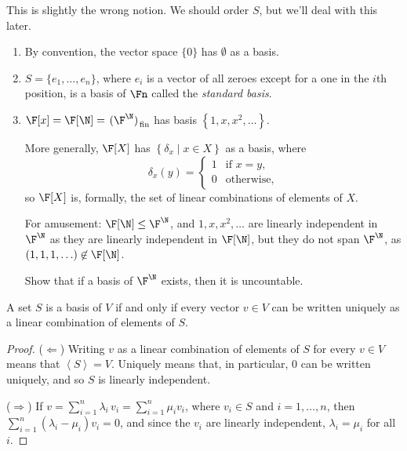 \vspace{3pt}

\begin{remark}
	This is slightly the wrong notion. We should order $S$, but we'll deal with this later. %
\end{remark}

\begin{examples}
	\begin{enumerate}
		\shortskip
		\item By convention, the vector space $\{0\}$ has $\emptyset$ as a basis.
		\item $S=\{e_1,\ldots,e_n\}$, where $e_i$ is a vector of all zeroes except for a one in the $i$th position, is a basis of $\Fn$ called the \emph{standard basis}. %

		\item $\F[x] = \F[\N] = \left.(\F^\N)\right._\text{fin}$ has basis $\left\{1,x,x^2,\ldots\right\}$. %
		
		More generally, $\F[X]$ has $\left\{\delta_x \mid x\in X\right\}$ as a basis, where %
		\begin{equation*}
			\delta_x(y) =
			\begin{cases}
				1 & \text{if } x=y, \\ %
				0 & \text{otherwise},
			\end{cases}
		\end{equation*}
		so $\F[X]$ is, formally, the set of linear combinations of elements of $X$. %
		
		For amusement: $\F[\N]\leq \F^\N$, and $1,x,x^2,\ldots$ are linearly independent in $\F^\N$ as they are linearly independent in $\F[\N]$, but they do not span $\F^\N$, as $(1,1,1,\ldots)\not\in\F[\N]$. %
		
		Show that if a basis of $\F^\N$ exists, then it is uncountable.
	\end{enumerate}
\end{examples}

\begin{lemma}
	A set $S$ is a basis of $V$ if and only if every vector $v\in V$ can be written uniquely as a linear combination of elements of $S$. %
\end{lemma}

\begin{proof}
	($\Leftarrow$) Writing $v$ as a linear combination of elements of $S$ for every $v\in V$ means that $\left\langle S \right\rangle=V$. Uniquely means that, in particular, 0 can be written uniquely, and so $S$ is linearly independent. %
	
	($\Rightarrow$) If $v=\sum_{i=1}^n \lambda_i \,v_i=\sum_{i=1}^n \mu_i  v_i$, where $v_i \in S$ and $i=1,\ldots,n$, then $\sum_{i=1}^n \left( \lambda_i-\mu_i \right)v_i=0$, and since the $v_i$ are linearly independent, $\lambda_i=\mu_i$ for all $i$. %
\end{proof}

